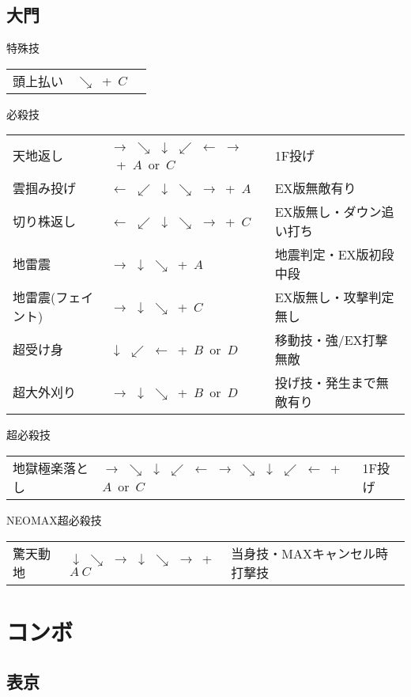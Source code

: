 \documentclass[a4j,11pt]{jarticle}
\begin{document}
\subsection{大門}
\begin{itembox}[l]{特殊技}
\begin{tabular}{lll}
頭上払い&$\searrow$\ +\ $C$&
\end{tabular}
\end{itembox}
\begin{itembox}[l]{必殺技}
\begin{tabular}{lll}
天地返し&$\rightarrow$ $\searrow$ $\downarrow$ $\swarrow$ $\leftarrow$ $\rightarrow$\ +\ $A$\ or\ $C$&1F投げ\\
雲掴み投げ&$\leftarrow$ $\swarrow$ $\downarrow$ $\searrow$ $\rightarrow$\ +\ $A$&EX版無敵有り\\
切り株返し&$\leftarrow$ $\swarrow$ $\downarrow$ $\searrow$ $\rightarrow$\ +\ $C$&EX版無し・ダウン追い打ち\\
地雷震&$\rightarrow$ $\downarrow$ $\searrow$\ +\ $A$&地震判定・EX版初段中段\\
地雷震(フェイント)&$\rightarrow$ $\downarrow$ $\searrow$\ +\ $C$&EX版無し・攻撃判定無し\\
超受け身&$\downarrow$ $\swarrow$ $\leftarrow$\ +\ $B$\ or\ $D$&移動技・強/EX打撃無敵\\
超大外刈り&$\rightarrow$ $\downarrow$ $\searrow$\ +\ $B$\ or\ $D$&投げ技・発生まで無敵有り
\end{tabular}
\end{itembox}
\begin{itembox}[l]{超必殺技}
\begin{tabular}{lll}
地獄極楽落とし&$\rightarrow$ $\searrow$ $\downarrow$ $\swarrow$ $\leftarrow$ $\rightarrow$ $\searrow$ $\downarrow$ $\swarrow$ $\leftarrow$\ +\ $A$\ or\ $C$&1F投げ
\end{tabular}
\end{itembox}
\begin{itembox}[l]{NEOMAX超必殺技}
\begin{tabular}{lll}
驚天動地&$\downarrow$ $\searrow$ $\rightarrow$ $\downarrow$ $\searrow$ $\rightarrow$\ +\ $A\ C$&当身技・MAXキャンセル時打撃技
\end{tabular}
\end{itembox}
\newpage
\section{コンボ}
\subsection{表京}
\end{document}
